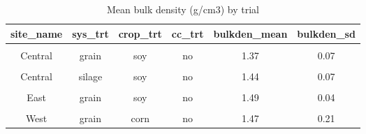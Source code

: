 \documentclass[
]{article}
\begin{document}
\begin{table}[H]

\caption{\label{tab:bulkden}Mean bulk density (g/cm3) by trial}
\centering
\begin{tabular}[t]{cccccc}
\toprule
site\_name & sys\_trt & crop\_trt & cc\_trt & bulkden\_mean & bulkden\_sd\\
\midrule
\cellcolor{gray!6}{Central} & \cellcolor{gray!6}{grain} & \cellcolor{gray!6}{soy} & \cellcolor{gray!6}{cc} & \cellcolor{gray!6}{1.42} & \cellcolor{gray!6}{0.08}\\
\cmidrule{1-6}
Central & grain & soy & no & 1.37 & 0.07\\
\cmidrule{1-6}
\cellcolor{gray!6}{Central} & \cellcolor{gray!6}{silage} & \cellcolor{gray!6}{soy} & \cellcolor{gray!6}{cc} & \cellcolor{gray!6}{1.46} & \cellcolor{gray!6}{0.06}\\
\cmidrule{1-6}
Central & silage & soy & no & 1.44 & 0.07\\
\cmidrule{1-6}
\cellcolor{gray!6}{East} & \cellcolor{gray!6}{grain} & \cellcolor{gray!6}{soy} & \cellcolor{gray!6}{cc} & \cellcolor{gray!6}{1.44} & \cellcolor{gray!6}{0.05}\\
\cmidrule{1-6}
East & grain & soy & no & 1.49 & 0.04\\
\cmidrule{1-6}
\cellcolor{gray!6}{West} & \cellcolor{gray!6}{grain} & \cellcolor{gray!6}{corn} & \cellcolor{gray!6}{cc} & \cellcolor{gray!6}{1.57} & \cellcolor{gray!6}{0.14}\\
\cmidrule{1-6}
West & grain & corn & no & 1.47 & 0.21\\
\bottomrule
\end{tabular}
\end{table}
\end{document}
